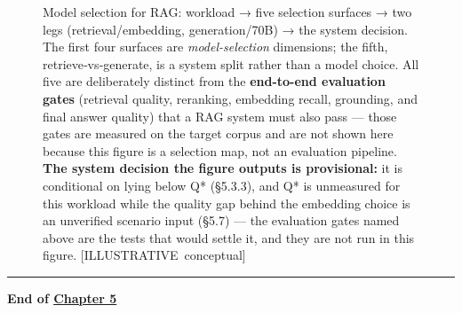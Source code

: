 \begin{figure}
\centering
{}
\caption[Model selection for RAG]{Model selection for RAG: workload → five selection surfaces → two legs (retrieval/embedding, generation/70B) → the system decision. The first four surfaces are \emph{model-selection} dimensions; the fifth, retrieve‑vs‑generate, is a system split rather than a model choice. All five are deliberately distinct from the \textbf{end-to-end evaluation gates} (retrieval quality, reranking, embedding recall, grounding, and final answer quality) that a RAG system must also pass --- those gates are measured on the target corpus and are not shown here because this figure is a selection map, not an evaluation pipeline. \textbf{The system decision the figure outputs is provisional:} it is conditional on lying below Q* (§5.3.3), and Q* is unmeasured for this workload while the quality gap behind the embedding choice is an unverified scenario input (§5.7) --- the evaluation gates named above are the tests that would settle it, and they are not run in this figure. \mbox{{[}ILLUSTRATIVE conceptual{]}}}

\label{fig:5.1}\end{figure}

\begin{center}\rule{0.5\linewidth}{0.5pt}\end{center}

\textbf{End of \hyperref[chap:5]{Chapter 5}}
